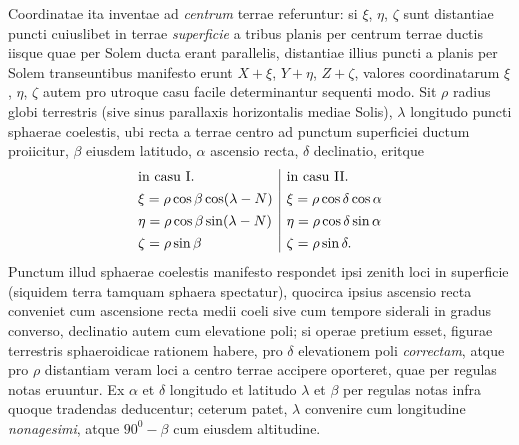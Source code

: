 Coordinatae ita inventae ad \textit{centrum} terrae referuntur: si $\xi$, $\eta$, $\zeta$ sunt distantiae puncti cuiuslibet in terrae \textit{superficie} a tribus planis per centrum terrae ductis iisque quae per Solem ducta erant parallelis, distantiae illius puncti a planis per Solem transeuntibus manifesto erunt $X+\xi$, $Y+\eta$, $Z+\zeta$, valores coordinatarum $\xi$, $\eta$, $\zeta$ autem pro utroque casu facile determinantur sequenti modo. Sit $\rho$ radius globi terrestris (sive sinus parallaxis horizontalis mediae Solis), $\lambda$ longitudo puncti sphaerae coelestis, ubi recta a terrae centro ad punctum superficiei ductum proiicitur, $\beta$ eiusdem latitudo, $\alpha$ ascensio recta, $\delta$ declinatio, eritque
\[
\begin{array}{@{}l|l@{}}
\text{in casu I.}&\text{in casu II.}\\[.4em]
\xi=\rho\cos\beta\cos(\lambda-N)&\xi=\rho\cos\delta\cos\alpha\\[.4em]
\eta=\rho\cos\beta\sin(\lambda-N)&\eta=\rho\cos\delta\sin\alpha\\[.4em]
\zeta=\rho\sin\beta&\zeta=\rho\sin\delta.
\end{array}
\]
Punctum illud sphaerae coelestis manifesto respondet ipsi zenith loci in superficie (siquidem terra tamquam sphaera spectatur), quocirca ipsius ascensio recta conveniet cum ascensione recta medii coeli sive cum tempore siderali in gradus converso, declinatio autem cum elevatione poli; si operae pretium esset, figurae terrestris sphaeroidicae rationem habere, pro $\delta$ elevationem poli \textit{correctam}, atque pro $\rho$ distantiam veram loci a centro terrae accipere oporteret, quae per regulas notas eruuntur. Ex $\alpha$ et $\delta$ longitudo et latitudo $\lambda$ et $\beta$ per regulas notas infra quoque tradendas deducentur; ceterum patet, $\lambda$ convenire cum longitudine \textit{nonagesimi}, atque $90^0-\beta$ cum eiusdem altitudine.
